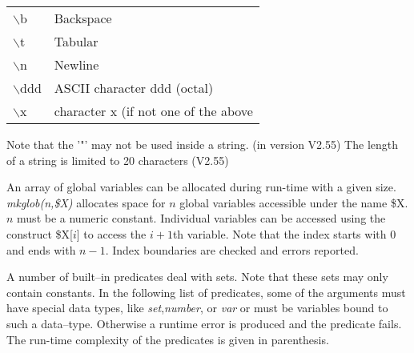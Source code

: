 \begin{center}
\begin{tabular}{|l|l|}
\hline
$\backslash$b & Backspace\\
$\backslash$t & Tabular\\
$\backslash$n & Newline\\
$\backslash$ddd & ASCII character ddd (octal)\\
$\backslash$x & character x (if not one of the above \\
\hline
\end{tabular}
\end{center}

Note that the '"' may not be used inside a string. (in version V2.55)
The length of a string is limited to 20 characters (V2.55)


An array of global variables can be allocated during run-time
with a given size. {\it mkglob(n,\$X)\/} allocates space for
$n$ global variables accessible under the name \$X.
$n$ must be a numeric constant. Individual variables can be accessed
using the construct \$X[$i$] to access the $i+1$th variable.
Note that the index starts with $0$ and ends with $n-1$.
Index boundaries are checked and errors reported.

A number of built--in predicates deal with sets. Note that
these sets may only contain constants.
In the following list of predicates, some of the arguments
must have special data types, like {\it set\/},{\it number\/}, or
{\it var\/} or must be variables bound to such a data--type.
Otherwise a runtime error is produced and the predicate fails.
The run-time complexity of the predicates is given in parenthesis.

